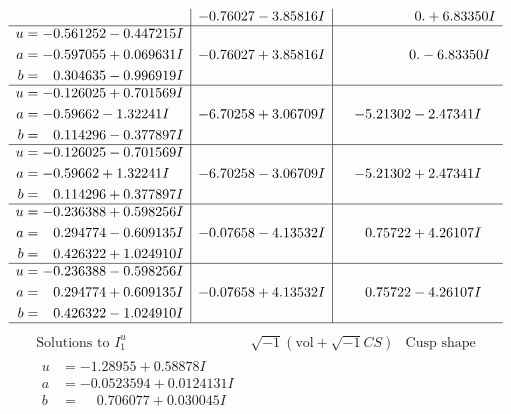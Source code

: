 \documentclass[1p]{elsarticle_modified}
\theoremstyle{definition}
\newcommand{\I}{\sqrt{-1}}
\begin{document}
$$\begin{array}{c|c|c}
 & -0.76027 - 3.85816 I & \phantom{-0.000000 -}0. + 6.83350 I \\ \hline\begin{aligned}
u &= -0.561252 - 0.447215 I \\
a &= -0.597055 + 0.069631 I \\
b &= \phantom{-}0.304635 - 0.996919 I\end{aligned}
 & -0.76027 + 3.85816 I & \phantom{-0.000000 } 0. - 6.83350 I \\ \hline\begin{aligned}
u &= -0.126025 + 0.701569 I \\
a &= -0.59662 - 1.32241 I \\
b &= \phantom{-}0.114296 - 0.377897 I\end{aligned}
 & -6.70258 + 3.06709 I & -5.21302 - 2.47341 I \\ \hline\begin{aligned}
u &= -0.126025 - 0.701569 I \\
a &= -0.59662 + 1.32241 I \\
b &= \phantom{-}0.114296 + 0.377897 I\end{aligned}
 & -6.70258 - 3.06709 I & -5.21302 + 2.47341 I \\ \hline\begin{aligned}
u &= -0.236388 + 0.598256 I \\
a &= \phantom{-}0.294774 - 0.609135 I \\
b &= \phantom{-}0.426322 + 1.024910 I\end{aligned}
 & -0.07658 - 4.13532 I & \phantom{-}0.75722 + 4.26107 I \\ \hline\begin{aligned}
u &= -0.236388 - 0.598256 I \\
a &= \phantom{-}0.294774 + 0.609135 I \\
b &= \phantom{-}0.426322 - 1.024910 I\end{aligned}
 & -0.07658 + 4.13532 I & \phantom{-}0.75722 - 4.26107 I\\
 \hline 
 \end{array}$$\newpage$$\begin{array}{c|c|c}  
\text{Solutions to }I^u_{1}& \I (\text{vol} + \sqrt{-1}CS) & \text{Cusp shape}\\
 \hline 
\begin{aligned}
u &= -1.28955 + 0.58878 I \\
a &= -0.0523594 + 0.0124131 I \\
b &= \phantom{-}0.706077 + 0.030045 I\end{aligned}

\end{array}$$
\end{document}
